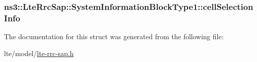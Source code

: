 \subsubsection[{\texorpdfstring{cell\+Selection\+Info}{cellSelectionInfo}}]{ ns3\+::\+Lte\+Rrc\+Sap\+::\+System\+Information\+Block\+Type1\+::cell\+Selection\+Info}\hypertarget{structns3_1_1LteRrcSap_1_1SystemInformationBlockType1_a6bfea3cb2d56cbd15ae5afbc13944f71}{}\label{structns3_1_1LteRrcSap_1_1SystemInformationBlockType1_a6bfea3cb2d56cbd15ae5afbc13944f71}


The documentation for this struct was generated from the following file\+:\begin{DoxyCompactItemize}
\item 
lte/model/\hyperlink{lte-rrc-sap_8h}{lte-\/rrc-\/sap.\+h}\end{DoxyCompactItemize}

